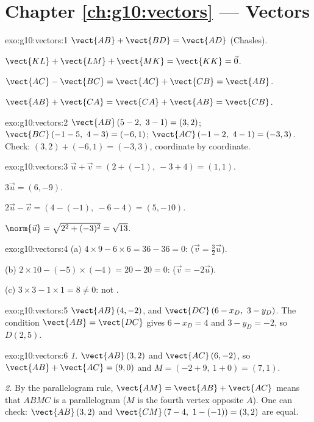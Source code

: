 \section*{Chapter \ref{ch:g10:vectors} --- Vectors}

\begin{solution}{exo:g10:vectors:1}
$\vect{AB} + \vect{BD} = \vect{AD}$ (Chasles).

$\vect{KL} + \vect{LM} + \vect{MK} = \vect{KK} = \vec 0$.

$\vect{AC} - \vect{BC} = \vect{AC} + \vect{CB} = \vect{AB}$.

$\vect{AB} + \vect{CA} = \vect{CA} + \vect{AB} = \vect{CB}$.
\end{solution}

\begin{solution}{exo:g10:vectors:2}
$\vect{AB}\,(5-2,\ 3-1) = (3, 2)$; \quad
$\vect{BC}\,(-1-5,\ 4-3) = (-6, 1)$; \quad
$\vect{AC}\,(-1-2,\ 4-1) = (-3, 3)$.
Check: $(3, 2) + (-6, 1) = (-3, 3)$, coordinate by coordinate.
\end{solution}

\begin{solution}{exo:g10:vectors:3}
$\vec u + \vec v = (2 + (-1),\ -3 + 4) = (1, 1)$.

$3\vec u = (6, -9)$.

$2\vec u - \vec v = (4 - (-1),\ -6 - 4) = (5, -10)$.

$\norm{\vec u} = \sqrt{2^2 + (-3)^2} = \sqrt{13}$.
\end{solution}

\begin{solution}{exo:g10:vectors:4}
(a) $4 \times 9 - 6 \times 6 = 36 - 36 = 0$: 
($\vec v = \frac32 \vec u$).

(b) $2 \times 10 - (-5) \times (-4) = 20 - 20 = 0$: 
($\vec v = -2\vec u$).

(c) $3 \times 3 - 1 \times 1 = 8 \neq 0$: not .
\end{solution}

\begin{solution}{exo:g10:vectors:5}
$\vect{AB}\,(4, -2)$, and $\vect{DC}\,(6 - x_D,\ 3 - y_D)$. The condition
$\vect{AB} = \vect{DC}$ gives $6 - x_D = 4$ and $3 - y_D = -2$, so
$D(2, 5)$.
\end{solution}

\begin{solution}{exo:g10:vectors:6}
\emph{1.} $\vect{AB}\,(3, 2)$ and $\vect{AC}\,(6, -2)$, so
$\vect{AB} + \vect{AC} = (9, 0)$ and
$M = (-2 + 9,\ 1 + 0) = (7, 1)$.

\emph{2.} By the parallelogram rule, $\vect{AM} = \vect{AB} + \vect{AC}$
means that $ABMC$ is a parallelogram ($M$ is the fourth vertex opposite
$A$). One can check: $\vect{AB}\,(3,2)$ and $\vect{CM}\,(7-4,\ 1-(-1)) =
(3, 2)$ are equal.
\end{solution}


